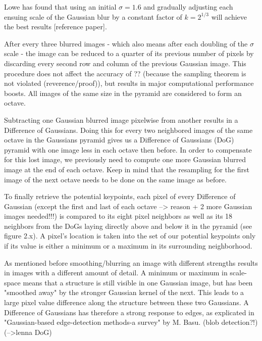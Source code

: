 \documentclass{article}
\begin{document}
	Lowe has found that using an initial $\sigma = 1.6$ and gradually adjusting each ensuing scale of the Gaussian blur by a constant factor of $k = 2^{1/3}$ will achieve the best results [reference paper].
	
	After every three blurred images - which also means after each doubling of the $\sigma$ scale - the image can be reduced to a quarter of its previous number of pixels by discarding every second row and column of the previous Gaussian image. This procedure does not affect the accuracy of ?? (because the sampling theorem is not violated (reverence/proof)), but results in major computational performance boosts. All images of the same size in the pyramid are considered to form an octave. 
	
	Subtracting one Gaussian blurred image pixelwise from another results in a Difference of Gaussians. Doing this for every two neighbored images of the same octave in the Gaussians pyramid gives us a Difference of Gaussians (DoG) pyramid with one image less in each octave then before. In order to compensate for this lost image, we previously need to compute one more Gaussian blurred image at the end of each octave. Keep in mind that the resampling for the first image of the next octave needs to be done on the same image as before.
	
	To finally retrieve the potential keypoints, each pixel of every Difference of Gaussian (except the first and last of each octave --> reason + 2 more Gaussian images needed!!!) is compared to its eight pixel neighbors as well as its 18 neighbors from the DoGs laying directly above and below it in the pyramid (see figure 2.x). A pixel's location is taken into the set of our potential keypoints only if its value is either a minimum or a maximum in its surrounding neighborhood. 
	
	As mentioned before smoothing/blurring an image with different strengths results in images with a different amount of detail. A minimum or maximum in scale-space means that a structure is still visible in one Gaussian image, but has been "smoothed away" by the stronger Gaussian kernel of the next. This leads to a large pixel value difference along the structure between these two Gaussians. A Difference of Gaussians has therefore a strong response to edges, as explicated in "Gaussian-based edge-detection methods-a survey" by M. Basu.
	(blob detection?!)
	(-->lenna DoG)
	
\end{document}
